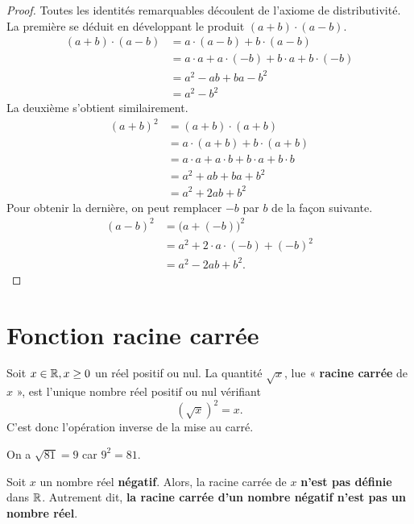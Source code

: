 \documentclass[a4paper, 12pt]{report}
\begin{document}
\begin{proof}
Toutes les identités remarquables découlent de l'axiome de distributivité.
	La première se déduit en développant le produit $(a+b)\cdot (a-b)$.
		\begin{align*}
			(a+b)\cdot(a-b) &= a \cdot(a-b) + b \cdot (a-b) \\
							&= a \cdot a + a \cdot (-b) + b\cdot a + b \cdot(-b)\\
							&= a^2 - ab + ba - b^2 \\
							&= a^2 - b^2
		\end{align*}
	La deuxième s'obtient similairement.
		\begin{align*}
			(a+b)^2 &= (a+b)\cdot(a+b) \\
						&= a \cdot(a+b) + b \cdot (a+b) \\
						&= a \cdot a + a \cdot b + b\cdot a + b \cdot b \\
						&= a^2 + ab + ba + b^2 \\
						&= a^2 +2ab + b^2
		\end{align*}
	Pour obtenir la dernière, on peut remplacer $-b$ par $b$ de la façon suivante.
		\begin{align*}
			(a-b)^2 &= \bigl( a + (-b) \bigr)^2 \\
					&= a^2 + 2\cdot a\cdot (-b) + (-b)^2 \\
					&= a^2 - 2ab + b^2.
		\end{align*}
\end{proof}

\section{Fonction racine carrée}

\begin{defn}	
Soit $x \in \mathbb{R}, x\geq0$ un réel positif ou nul.
	La quantité $\sqrt{x}$, lue « \textbf{racine carrée} de $x$ », est l'unique nombre réel positif ou nul vérifiant
		\[ (\sqrt{x})^2 = x. \]
	C'est donc l'opération inverse de la mise au carré.
\end{defn}

\begin{ex}
On a $\sqrt{81}=9$ car $9^2 = 81$.
\end{ex}

\begin{prop}
Soit $x$ un nombre réel \textbf{négatif}. Alors, la racine carrée de $x$ \textbf{n'est pas définie} dans $\mathbb{R}$.
Autrement dit, \textbf{la racine carrée d'un nombre négatif n'est pas un nombre réel}.
\end{prop}
\end{document}
